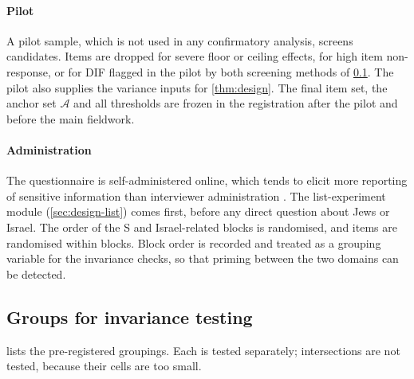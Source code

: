\paragraph{Pilot}
A pilot sample, which is not used in any confirmatory analysis, screens candidates. Items are dropped for severe floor or ceiling effects, for high item non-response, or for DIF flagged in the pilot by both screening methods of \cref{sec:design-groups}. The pilot also supplies the variance inputs for \cref{thm:design}. The final item set, the anchor set $\mathcal{A}$ and all thresholds are frozen in the registration after the pilot and before the main fieldwork.

\paragraph{Administration}
The questionnaire is self-administered online, which tends to elicit more reporting of sensitive information than interviewer administration \citep{kreuter2008}. The list-experiment module (\cref{sec:design-list}) comes first, before any direct question about Jews or Israel. The order of the S and Israel-related blocks is randomised, and items are randomised within blocks. Block order is recorded and treated as a grouping variable for the invariance checks, so that priming between the two domains can be detected.

\subsection{Groups for invariance testing}\label{sec:design-groups}

 lists the pre-registered groupings. Each is tested separately; intersections are not tested, because their cells are too small.


